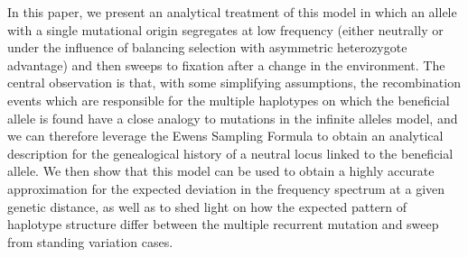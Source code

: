 \documentclass[a4paper,10pt]{article}
\begin{document}
In this paper, we present an analytical treatment of this model in which an allele with a single mutational origin segregates at low frequency (either neutrally or under the influence of balancing selection with asymmetric heterozygote advantage) and then sweeps to fixation after a change in the environment. The central observation is that, with some simplifying assumptions, the recombination events which are responsible for the multiple haplotypes on which the beneficial allele is found have a close analogy to mutations in the infinite alleles model, and we can therefore leverage the Ewens Sampling Formula to obtain an analytical description for the genealogical history of a neutral locus linked to the beneficial allele. We then show that this model can be used to obtain a highly accurate approximation for the expected deviation in the frequency spectrum at a given genetic distance, as well as to shed light on how the expected pattern of haplotype structure differ between the multiple recurrent mutation and sweep from standing  variation cases.
 
\end{document}
